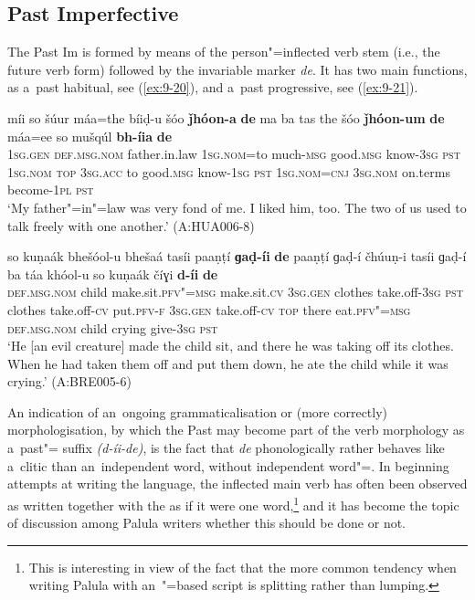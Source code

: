 \subsection{Past Imperfective}
\label{subsec:9-1-6}

The Past Im is formed by means of the person"=inflected  verb stem (i.e., the future verb form) followed by the invariable marker \textit{de}. It has two main functions, as a~past habitual, see (\ref{ex:9-20}), and a~past progressive, see (\ref{ex:9-21}).

\ea
\label{ex:9-20}
\gll míi so šúur máa=the bíiḍ-u šóo \textbf{ǰhóon-a} \textbf{de} ma ba tas the šóo \textbf{ǰhóon-um} \textbf{de} máa=ee so mušqúl \textbf{bh-íia} \textbf{de}\\
\textsc{1sg.gen} \textsc{def.msg.nom} father.in.law \textsc{1sg.nom=}to much-\textsc{msg} good.\textsc{msg} know-\textsc{3sg} \textsc{pst} \textsc{1sg.nom} \textsc{top} \textsc{3sg.acc}  to good.\textsc{msg} know-\textsc{1sg } \textsc{pst } \textsc{1sg.nom=cnj}  \textsc{3sg.nom} on.terms become-\textsc{1pl} \textsc{pst} \\
\glt `My father"=in"=law was very fond of me. I liked him, too. The two of us used to talk freely with one another.' (A:HUA006-8)

\ex
\label{ex:9-21}
\gll so kuṇaák bhešóol-u bhešaá tasíi paaṇṭí \textbf{ɡaḍ-íi} \textbf{de} paaṇṭí ɡaḍ-í čhúuṇ-i tasíi ɡaḍ-í ba táa khóol-u so kuṇaák číɣi \textbf{d-íi} \textbf{de} \\
\textsc{def.msg.nom} child make.sit.\textsc{pfv"=msg} make.sit.\textsc{cv} \textsc{3sg.gen}  clothes take.off-\textsc{3sg } \textsc{pst} clothes take.off-\textsc{cv} put.\textsc{pfv-f}  \textsc{3sg.gen} take.off-\textsc{cv} \textsc{top} there eat.\textsc{pfv"=msg}  \textsc{def.msg.nom} child crying give-\textsc{3sg} \textsc{pst} \\
\glt `He [an evil creature] made the child sit, and there he was taking off its clothes. When he had taken them off and put them down, he ate the child while it was crying.' (A:BRE005-6)
\z

An indication of an~ongoing grammaticalisation or (more correctly) morphologisation, by which the Past  may become part of the verb morphology as a~past"= suffix \textit{(d-íi-de)}, is the fact that \textit{de} phonologically rather behaves like a~clitic than an~independent word, without independent word"=. In beginning attempts at writing the language, the inflected main verb has often been observed as written together with the   as if it were one word,\footnote{This is interesting in view of the fact that the more common tendency when writing Palula with an~\iliArabic"=based script is splitting rather than lumping.} and it has become the topic of discussion among Palula writers whether this should be done or not. 


